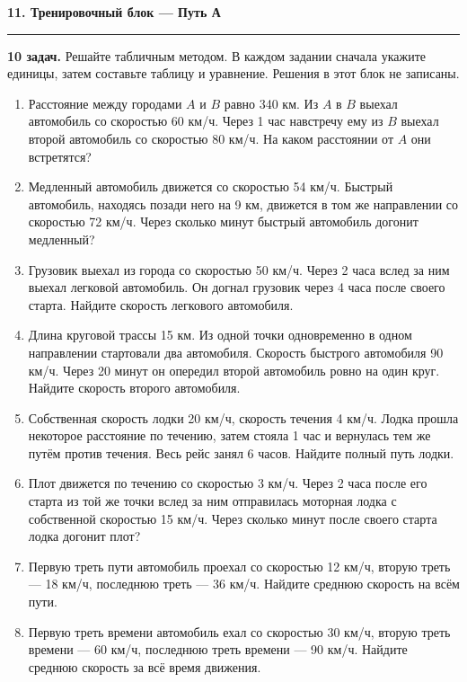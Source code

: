 \documentclass[a4paper,12pt]{article}
\newcommand{\sectiontitle}[1]{%
  \vspace{2mm}%
  {\Large\bfseries\color{darkaccent}#1}\par
  \vspace{1mm}\color{rulegray}\hrule\color{textgray}\vspace{3mm}%
}
\begin{document}
\clearpage

\sectiontitle{11. Тренировочный блок — Путь А}

\textbf{10 задач.} Решайте табличным методом. В каждом задании сначала укажите единицы, затем составьте таблицу и уравнение. Решения в этот блок не записаны.

\begin{enumerate}
  \item Расстояние между городами $A$ и $B$ равно 340 км. Из $A$ в $B$ выехал автомобиль со скоростью 60 км/ч. Через 1 час навстречу ему из $B$ выехал второй автомобиль со скоростью 80 км/ч. На каком расстоянии от $A$ они встретятся?

  \item Медленный автомобиль движется со скоростью 54 км/ч. Быстрый автомобиль, находясь позади него на 9 км, движется в том же направлении со скоростью 72 км/ч. Через сколько минут быстрый автомобиль догонит медленный?

  \item Грузовик выехал из города со скоростью 50 км/ч. Через 2 часа вслед за ним выехал легковой автомобиль. Он догнал грузовик через 4 часа после своего старта. Найдите скорость легкового автомобиля.

  \item Длина круговой трассы 15 км. Из одной точки одновременно в одном направлении стартовали два автомобиля. Скорость быстрого автомобиля 90 км/ч. Через 20 минут он опередил второй автомобиль ровно на один круг. Найдите скорость второго автомобиля.

  \item Собственная скорость лодки 20 км/ч, скорость течения 4 км/ч. Лодка прошла некоторое расстояние по течению, затем стояла 1 час и вернулась тем же путём против течения. Весь рейс занял 6 часов. Найдите полный путь лодки.

  \item Плот движется по течению со скоростью 3 км/ч. Через 2 часа после его старта из той же точки вслед за ним отправилась моторная лодка с собственной скоростью 15 км/ч. Через сколько минут после своего старта лодка догонит плот?

  \item Первую треть пути автомобиль проехал со скоростью 12 км/ч, вторую треть — 18 км/ч, последнюю треть — 36 км/ч. Найдите среднюю скорость на всём пути.

  \item Первую треть времени автомобиль ехал со скоростью 30 км/ч, вторую треть времени — 60 км/ч, последнюю треть времени — 90 км/ч. Найдите среднюю скорость за всё время движения.


\end{enumerate}
\end{document}
